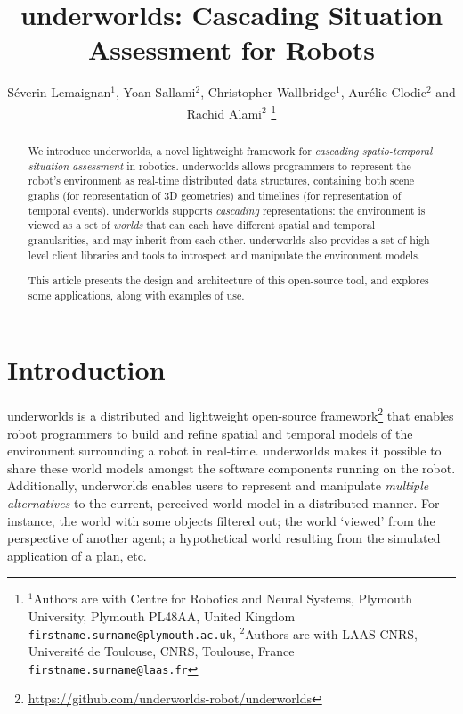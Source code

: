 \documentclass[letterpaper, 10pt, conference]{ieeeconf}
\newcommand{\uwds}{{\sc underworlds}\xspace}
\begin{document}
\title{\LARGE \bf
{\sc underworlds}: Cascading Situation Assessment for Robots
}


\author{S\'everin Lemaignan$^{1}$, Yoan Sallami$^{2}$, Christopher Wallbridge$^{1}$, Aur\'elie Clodic$^{2}$ and Rachid Alami$^{2}$%
\thanks{$^{1}$Authors are with Centre for Robotics and Neural Systems,
        Plymouth University, Plymouth PL48AA, United Kingdom
        {\tt\small firstname.surname@plymouth.ac.uk},
	$^{2}$Authors are with LAAS-CNRS, Université de Toulouse, CNRS, Toulouse, France
        {\tt\small firstname.surname@laas.fr}}%
}




\maketitle
\thispagestyle{empty}
\pagestyle{empty}

\begin{abstract}

    We introduce \uwds, a novel lightweight framework for \emph{cascading
    spatio-temporal situation assessment} in robotics. \uwds allows programmers
    to represent the robot's environment as real-time distributed data
    structures, containing both scene graphs (for representation of 3D
    geometries) and timelines (for representation of temporal events). \uwds
    supports \emph{cascading} representations: the environment is viewed as a
    set of \emph{worlds} that can each have different spatial and temporal
    granularities, and may inherit from each other.  \uwds also provides a set of
    high-level client libraries and tools to introspect and manipulate the
    environment models.

    This article presents the design and architecture of this open-source tool,
    and explores some applications, along with examples of use.

\end{abstract}


\section{Introduction}


\uwds is a distributed and lightweight open-source
framework\footnote{\url{https://github.com/underworlds-robot/underworlds}} that
enables robot programmers to build and refine spatial and temporal
models of the environment surrounding a robot in real-time. \uwds makes it possible to share
these world models amongst the software components running on the robot.
Additionally, \uwds enables users to represent and manipulate
\emph{multiple alternatives} to the current, perceived world model in a distributed manner. For
instance, the world with some objects filtered out; the world `viewed' from the
perspective of another agent; a hypothetical world resulting from the simulated
application of a plan, etc.
\end{document}
